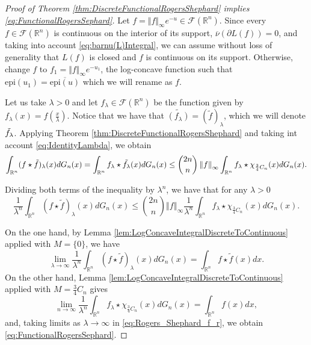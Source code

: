 \documentclass{amsart}
\newcommand{\R}{\mathbb R}
\newcommand{\norma}[1]{\left\Vert#1\right\Vert}
\theoremstyle{remark}
\theoremstyle{definition}
\numberwithin{equation}{section}
\begin{document}
\begin{proof}[Proof of Theorem \ref{thm:DiscreteFunctionalRogersShephard} implies \eqref{eq:FunctionalRogersSephard}]

Let $f=\Vert f\Vert_\infty e^{-u}\in\mathcal{F}(\R^n)$. Since every $f\in\mathcal{F}(\R^n)$ is continuous on the interior of its support, $\overline{\nu}(\partial L(f))=0$, and taking into account \eqref{eq:barnu(L)Integral}, we can assume without loss of generality that $L(f)$ is closed and $f$ is continuous on its support. Otherwise, change $f$ to $f_1=\Vert f\Vert_\infty e^{-u_1}$, the log-concave function such that $\textrm{epi}(u_1)=\overline{\textrm{epi}(u)}$ which we will rename as $f$.

Let us take $\lambda>0$ and let $f_{\lambda}\in\mathcal{F}(\R^n)$ be the function given by $f_{\lambda}(x)=f\left( \frac{x}{\lambda} \right)$. Notice that we have that $\widetilde{(f_{\lambda})}=(\tilde{f})_{\lambda}$, which we will denote $\Tilde{f_{\lambda}}$. Applying Theorem \ref{thm:DiscreteFunctionalRogersShephard} and taking int account \eqref{eq:IdentityLambda}, we obtain
\begin{equation*}
\int_{\R^n} (f\star\tilde{f})_\lambda (x) dG_n(x)=\int_{\R^n} f_{\lambda} \star \Tilde{f_{\lambda}} (x) dG_n(x) \leq \binom{2n}{n} \norma{f}_{\infty} \int_{\R^n} f_{\lambda} \star \chi_{\frac{3}{4}C_n} (x) dG_n(x).
\end{equation*}

Dividing both terms of the inequality by $\lambda^n$, we have that for any $\lambda>0$
\begin{equation} \label{eq:Rogers_Shephard_f_r}
\frac{1}{\lambda^n} \int_{\R^n} (f\star\tilde{f})_\lambda (x) dG_n(x) \leq \binom{2n}{n} \norma{f}_{\infty} \frac{1}{\lambda^n}  \int_{\R^n} f_{\lambda} \star \chi_{\frac{3}{4}C_n} (x) dG_n(x).
\end{equation}

On the one hand, by Lemma \ref{lem:LogConcaveIntegralDiscreteToContinuous} applied with $M=\{0\}$, we have
$$
\lim_{\lambda \to \infty} \frac{1}{\lambda^n}\int_{\R^n} (f\star\tilde{f})_\lambda (x) dG_n(x)= \int_{\R^n} f \star \tilde{f}(x) dx.
$$
On the other hand, Lemma \ref{lem:LogConcaveIntegralDiscreteToContinuous} applied with $M=\frac{3}{4}C_n$ gives
$$
\lim_{n\to\infty}\frac{1}{\lambda^n}  \int_{\R^n} f_{\lambda} \star \chi_{\frac{3}{4}C_n} (x) dG_n(x)=\int_{\R^n}f(x)dx,
$$
and, taking limits as $\lambda\to\infty$ in \eqref{eq:Rogers_Shephard_f_r}, we obtain \eqref{eq:FunctionalRogersSephard}.


\end{proof}
\end{document}
